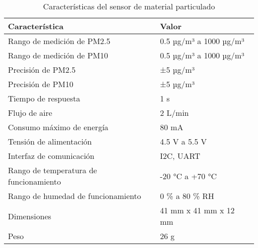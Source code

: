 \begin{table}[H]
\centering
\caption{Características del sensor de material particulado}
\label{tab:sensor_caracteristicas}
\begin{tabular}{|l|l|}
\hline
\textbf{Característica}                              & \textbf{Valor}                         \\ \hline
Rango de medición de PM2.5                           & 0.5 µg/m³ a 1000 µg/m³                 \\ \hline
Rango de medición de PM10                            & 0.5 µg/m³ a 1000 µg/m³                 \\ \hline
Precisión de PM2.5                                   & ±5 µg/m³                               \\ \hline
Precisión de PM10                                    & ±5 µg/m³                               \\ \hline
Tiempo de respuesta                                  & 1 s                                    \\ \hline
Flujo de aire                                        & 2 L/min                                \\ \hline
Consumo máximo de energía                            & 80 mA                                  \\ \hline
Tensión de alimentación                              & 4.5 V a 5.5 V                          \\ \hline
Interfaz de comunicación                             & I2C, UART                              \\ \hline
Rango de temperatura de funcionamiento               & -20 °C a +70 °C                        \\ \hline
Rango de humedad de funcionamiento                   & 0 \% a 80 \% RH                        \\ \hline
Dimensiones                                          & 41 mm x 41 mm x 12 mm                  \\ \hline
Peso                                                 & 26 g                                   \\ \hline
\end{tabular}
\end{table}
